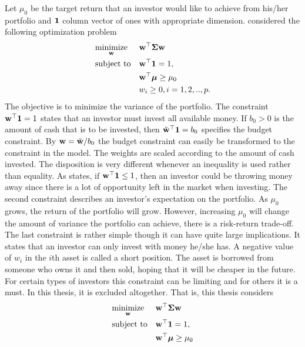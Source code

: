 \documentclass[12pt, twoside]{book}\usepackage{knitr}
\begin{document}
Let $\mu_0$ be the target return that an investor would like to achieve from his/her portfolio and $\mathbf{1}$ column vector of ones with appropriate dimension. 
\citet{markowitz1959portfolio} considered the following optimization problem
\begin{equation}\label{eqn:markowitz_optim}
\begin{aligned}
& \underset{\mathbf{w}}{\text{minimize}} 
& & \mathbf{w}^\top \mathbf{\Sigma} \mathbf{w} \\
& \text{subject to}
& & \mathbf{w}^\top \mathbf{1} = 1, \\
& && \mathbf{w}^\top \mbox{\boldmath$\mu$} \geq \mu_0 \\
&&& w_i \geq 0, i=1,2,..,p.
\end{aligned}
\end{equation}
The objective is to minimize the variance of the portfolio. 
The constraint $\mathbf{w}^\top \mathbf{1} = 1$ states that an investor must invest all available money.
If $b_0>0$ is the amount of cash that is to be invested, then $\tilde{\mathbf{w}}^\top\mathbf{1} = b_0$ specifies the budget constraint.
By $\mathbf{w}=\tilde{\mathbf{w}}/b_0$ the budget constraint can easily be transformed to the constraint in the model.
The weights are scaled according to the amount of cash invested.
The disposition is very different whenever an inequality is used rather than equality.
As \citet{hult2012risk} states, if $\mathbf{w}^\top \mathbf{1} \leq 1$, then an investor could be throwing money away since there is a lot of opportunity left in the market when investing.
The second constraint describes an investor's expectation on the portfolio.
As $\mu_0$ grows, the return of the portfolio will grow. 
However, increasing $\mu_0$ will change the amount of variance the portfolio can achieve, there is a risk-return trade-off. 
The last constraint is rather simple though it can have quite large implications. 
It states that an investor can only invest with money he/she has. 
A negative value of $w_i$ in the $i$th asset is called a short position.
The asset is borrowed from someone who owns it and then sold, hoping that it will be cheaper in the future.
For certain types of investors this constraint can be limiting and for others it is a must.
In this thesis, it is excluded altogether. 
That is, this thesis considers
\begin{equation}\label{eqn:mean_variance}
\begin{aligned}
& \underset{\mathbf{w}}{\text{minimize}} 
& & \mathbf{w}^\top \mathbf{\Sigma} \mathbf{w} \\
& \text{subject to}
& & \mathbf{w}^\top \mathbf{1} = 1, \\
& && \mathbf{w}^\top \mbox{\boldmath$\mu$} \geq \mu_0 \\
\end{aligned}
\end{equation}
\end{document}
